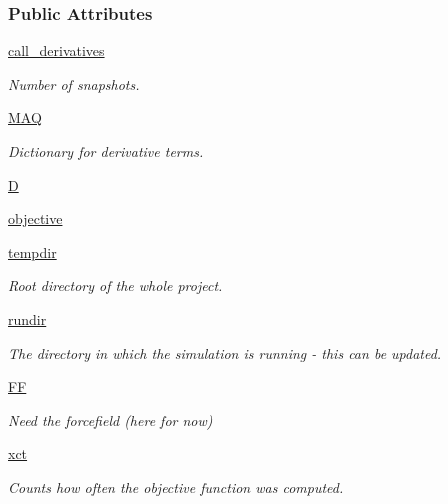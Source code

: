 \subsubsection*{\-Public \-Attributes}
\begin{DoxyCompactItemize}
\item 
\hyperlink{classforcebalance_1_1leastsq_1_1LeastSquares_a667caf3a5471d9063ab400dcbb40a003}{call\-\_\-derivatives}
\begin{DoxyCompactList}\small\item\em \-Number of snapshots. \end{DoxyCompactList}\item 
\hyperlink{classforcebalance_1_1leastsq_1_1LeastSquares_afb0f39fe6182aa11a66645e6c5342412}{\-M\-A\-Q}
\begin{DoxyCompactList}\small\item\em \-Dictionary for derivative terms. \end{DoxyCompactList}\item 
\hyperlink{classforcebalance_1_1leastsq_1_1LeastSquares_a1691b076e288ed6a3685c38f56653767}{\-D}
\item 
\hyperlink{classforcebalance_1_1leastsq_1_1LeastSquares_a893f3c1d9632501cef6251d5beea03a4}{objective}
\item 
\hyperlink{classforcebalance_1_1target_1_1Target_aede2856573b890cd47054ad36937d6f6}{tempdir}
\begin{DoxyCompactList}\small\item\em \-Root directory of the whole project. \end{DoxyCompactList}\item 
\hyperlink{classforcebalance_1_1target_1_1Target_a1da470037ef61c22dc44beb85cfa01a9}{rundir}
\begin{DoxyCompactList}\small\item\em \-The directory in which the simulation is running -\/ this can be updated. \end{DoxyCompactList}\item 
\hyperlink{classforcebalance_1_1target_1_1Target_a796dc30a19a60c63fb43b088d40a963f}{\-F\-F}
\begin{DoxyCompactList}\small\item\em \-Need the forcefield (here for now) \end{DoxyCompactList}\item 
\hyperlink{classforcebalance_1_1target_1_1Target_ad4cd0ab38d8fc97d3e7a6e22ce130a16}{xct}
\begin{DoxyCompactList}\small\item\em \-Counts how often the objective function was computed. \end{DoxyCompactList}\item 

\end{DoxyCompactItemize}
